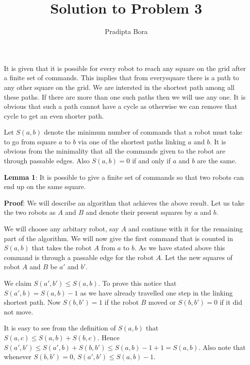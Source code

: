 \documentclass[a4paper]{article}
\title{Solution to Problem 3}
\author{Pradipta Bora}
\begin{document}
\maketitle

It is given that it is possible for every robot to reach any square on the grid after a finite set of commands. This implies that from everysquare there is a path to any other square on the grid. We are intersted in the shortest path among all these paths. If there are more than one such paths then we will use any one. It is obvious that such a path cannot have a cycle as otherwise we can remove that cycle to get an even shorter path. \newline

Let $S(a, b)$ denote the minimum number of commands that a robot must take to go from  square $a$ to $b$ via one of the shortest paths linking $a$ and $b$. It is obvious from the minimality that all the commands given to the robot are through passable edges. Also $S(a, b) = 0$ if and only if $a$ and $b$ are the same. \newline

\textbf{Lemma 1}: It is possible to give a finite set of commands so that two robots can end up on the same square.

\textbf{Proof}: We will describe an algorithm that achieves the above result.
Let us take the two robots as $A$ and $B$ and denote their present squares by $a$ and $b$. \newline

We will choose any arbitary robot, say $A$ and continue with it for the remaining part of the algorithm. We will now give the first command that is counted in $S(a, b)$ that takes the robot $A$ from $a$ to $b$. As we have stated above this command is through a passable edge for the robot $A$. Let the new squares of robot $A$ and $B$ be $a'$ and $b'$. \newline

We claim $S(a', b') \leq S(a, b)$. To prove this notice that $S(a', b) = S(a, b) - 1$ as we have already travelled one step in the linking shortest path. Now $S(b, b') = 1 $ if the robot $B$ moved or $S(b, b') = 0$ if it did not move.\newline

It is easy to see from the definition of $S(a, b)$ that $S(a, c) \leq S(a, b) + S(b, c)$. Hence $S(a', b')  \leq S(a', b) + S(b, b') \leq  S(a, b) - 1 + 1 = S(a, b)$. Also note that whenever $S(b, b') = 0$, $S(a', b') \leq S(a, b) - 1$.\newline
\end{document}
